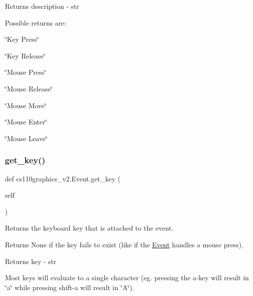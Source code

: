 \begin{DoxyReturn}{Returns}
description -\/ str
\end{DoxyReturn}
Possible returns are\+:
\begin{DoxyItemize}
\item \char`\"{}\+Key Press\char`\"{}
\item \char`\"{}\+Key Release\char`\"{}
\item \char`\"{}\+Mouse Press\char`\"{}
\item \char`\"{}\+Mouse Release\char`\"{}
\item \char`\"{}\+Mouse Move\char`\"{}
\item \char`\"{}\+Mouse Enter\char`\"{}
\item \char`\"{}\+Mouse Leave\char`\"{} 
\end{DoxyItemize}\mbox{\label{classcs110graphics__v2_1_1Event_a05ed480b66fac134b5dca14ee73b97f8}} 
\subsubsection{\texorpdfstring{get\_key()}{get\_key()}}
{\footnotesize\ttfamily def cs110graphics\+\_\+v2.\+Event.\+get\+\_\+key (\begin{DoxyParamCaption}\item[{}]{self }\end{DoxyParamCaption})}



Returns the keyboard key that is attached to the event. 

Returns None if the key fails to exist (like if the \mbox{\hyperlink{classcs110graphics__v2_1_1Event}{Event}} handles a mouse press). \begin{DoxyReturn}{Returns}
key -\/ str
\end{DoxyReturn}
Most keys will evaluate to a single character (eg. pressing the a-\/key will result in \char`\"{}a\char`\"{} while pressing shift-\/a will result in \char`\"{}\+A\char`\"{}). \mbox{\label{classcs110graphics__v2_1_1Event_a2cbccb965cf126442862970d7c5ce365}} 
